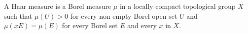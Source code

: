 A Haar measure is a Borel measure $\mu$ in a locally compact topological group $X$ such that $\mu(U) > 0$ for every non empty Borel open set $U$ and $\mu(xE) = \mu(E)$ for every Borel set $E$ and every $x$ in $X$.
